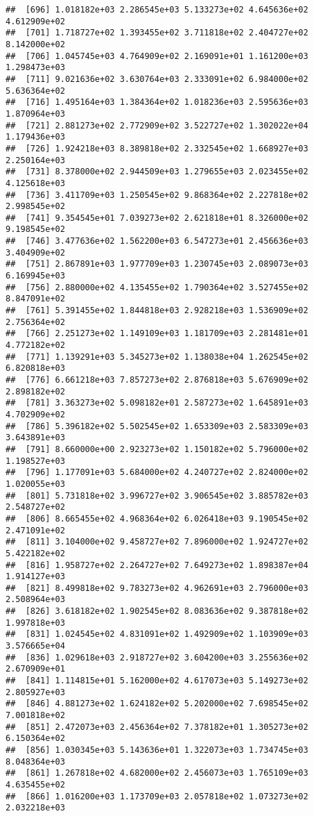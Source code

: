 \documentclass[]{article}
\begin{document}
\begin{verbatim}
##  [696] 1.018182e+03 2.286545e+03 5.133273e+02 4.645636e+02 4.612909e+02
##  [701] 1.718727e+02 1.393455e+02 3.711818e+02 2.404727e+02 8.142000e+02
##  [706] 1.045745e+03 4.764909e+02 2.169091e+01 1.161200e+03 1.298473e+03
##  [711] 9.021636e+02 3.630764e+03 2.333091e+02 6.984000e+02 5.636364e+02
##  [716] 1.495164e+03 1.384364e+02 1.018236e+03 2.595636e+03 1.870964e+03
##  [721] 2.881273e+02 2.772909e+02 3.522727e+02 1.302022e+04 1.179436e+03
##  [726] 1.924218e+03 8.389818e+02 2.332545e+02 1.668927e+03 2.250164e+03
##  [731] 8.378000e+02 2.944509e+03 1.279655e+03 2.023455e+02 4.125618e+03
##  [736] 3.411709e+03 1.250545e+02 9.868364e+02 2.227818e+02 2.998545e+02
##  [741] 9.354545e+01 7.039273e+02 2.621818e+01 8.326000e+02 9.198545e+02
##  [746] 3.477636e+02 1.562200e+03 6.547273e+01 2.456636e+03 3.404909e+02
##  [751] 2.867891e+03 1.977709e+03 1.230745e+03 2.089073e+03 6.169945e+03
##  [756] 2.880000e+02 4.135455e+02 1.790364e+02 3.527455e+02 8.847091e+02
##  [761] 5.391455e+02 1.844818e+03 2.928218e+03 1.536909e+02 2.756364e+02
##  [766] 2.251273e+02 1.149109e+03 1.181709e+03 2.281481e+01 4.772182e+02
##  [771] 1.139291e+03 5.345273e+02 1.138038e+04 1.262545e+02 6.820818e+03
##  [776] 6.661218e+03 7.857273e+02 2.876818e+03 5.676909e+02 2.898182e+02
##  [781] 3.363273e+02 5.098182e+01 2.587273e+02 1.645891e+03 4.702909e+02
##  [786] 5.396182e+02 5.502545e+02 1.653309e+03 2.583309e+03 3.643891e+03
##  [791] 8.660000e+00 2.923273e+02 1.150182e+02 5.796000e+02 1.198527e+03
##  [796] 1.177091e+03 5.684000e+02 4.240727e+02 2.824000e+02 1.020055e+03
##  [801] 5.731818e+02 3.996727e+02 3.906545e+02 3.885782e+03 2.548727e+02
##  [806] 8.665455e+02 4.968364e+02 6.026418e+03 9.190545e+02 2.471091e+02
##  [811] 3.104000e+02 9.458727e+02 7.896000e+02 1.924727e+02 5.422182e+02
##  [816] 1.958727e+02 2.264727e+02 7.649273e+02 1.898387e+04 1.914127e+03
##  [821] 8.499818e+02 9.783273e+02 4.962691e+03 2.796000e+03 2.508964e+03
##  [826] 3.618182e+02 1.902545e+02 8.083636e+02 9.387818e+02 1.997818e+03
##  [831] 1.024545e+02 4.831091e+02 1.492909e+02 1.103909e+03 3.576665e+04
##  [836] 1.029618e+03 2.918727e+02 3.604200e+03 3.255636e+02 2.670909e+01
##  [841] 1.114815e+01 5.162000e+02 4.617073e+03 5.149273e+02 2.805927e+03
##  [846] 4.881273e+02 1.624182e+02 5.202000e+02 7.698545e+02 7.001818e+02
##  [851] 2.472073e+03 2.456364e+02 7.378182e+01 1.305273e+02 6.150364e+02
##  [856] 1.030345e+03 5.143636e+01 1.322073e+03 1.734745e+03 8.048364e+03
##  [861] 1.267818e+02 4.682000e+02 2.456073e+03 1.765109e+03 4.635455e+02
##  [866] 1.016200e+03 1.173709e+03 2.057818e+02 1.073273e+02 2.032218e+03

\end{verbatim}
\end{document}
